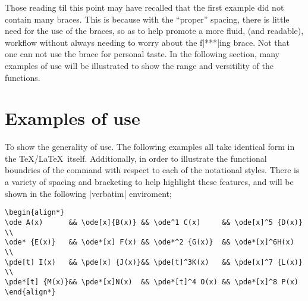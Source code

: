 \documentclass[11pt,a4paper]{ltxdoc}
\begin{document}
Those reading til this point may have recalled that the first example
did not contain many braces.
This is because with the ``proper'' spacing, there is little 
need for the use of the braces, so as to help promote a more fluid, 
(and readable),
workflow without always needing to worry about the f|***|ing brace. 
Not that one can not use the brace for personal taste. 
In the following section, many examples of use will be illustrated
to show the range and versitility of the functions.

\noindent
{}

\newpage
\section{Examples of use}\label{sec:examples}



To show the generality of use. The following examples all take identical form 
in the \TeX/\LaTeX\ itself. 
Additionally, in order to illustrate the functional boundries of the command with
respect to each of the notational styles. 
There is a variety of spacing and bracketing to help highlight these features,
and will be shown in the following |verbatim| enviroment; 

\noindent
\begin{minipage}{0.98\textwidth}
\begin{verbatim}
\begin{align*}
\ode A(x)      && \ode[x]{B(x)} && \ode^1 C(x)     && \ode[x]^5 {D(x)} \\
\ode* {E(x)}   && \ode*[x] F(x) && \ode*^2 {G(x)}  && \ode*[x]^6H(x)   \\
\pde[t] I(x)   && \pde[x] {J(x)}&& \pde[t]^3K(x)   && \pde[x]^7 {L(x)} \\
\pde*[t] {M(x)}&& \pde*[x]N(x)  && \pde*[t]^4 O(x) && \pde*[x]^8 P(x)
\end{align*}
\end{verbatim}
\end{minipage}
\end{document}
